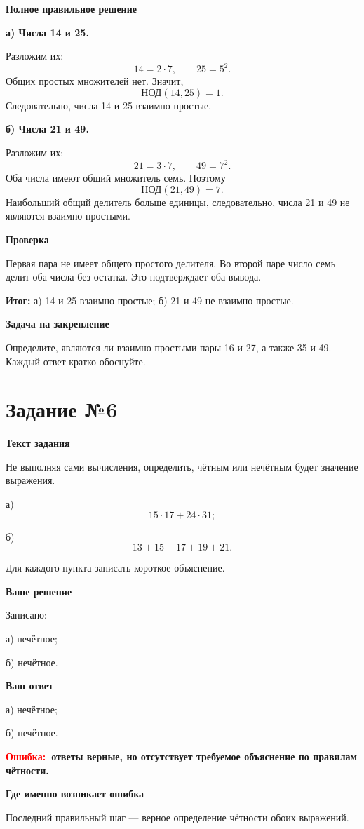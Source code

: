 \documentclass[12pt,a4paper]{article}
\newcommand{\err}{\textcolor{red}{Ошибка:}}
\newcommand{\result}{\textcolor{teal!60!black}{Итог:}}
\begin{document}
\textbf{Полное правильное решение}

\textbf{а) Числа 14 и 25.}

Разложим их:
\[
14=2\cdot7,
\qquad
25=5^2.
\]
Общих простых множителей нет. Значит,
\[
\text{НОД}(14,25)=1.
\]
Следовательно, числа 14 и 25 взаимно простые.

\textbf{б) Числа 21 и 49.}

Разложим их:
\[
21=3\cdot7,
\qquad
49=7^2.
\]
Оба числа имеют общий множитель семь. Поэтому
\[
\text{НОД}(21,49)=7.
\]
Наибольший общий делитель больше единицы, следовательно, числа 21 и 49 не являются взаимно простыми.

\textbf{Проверка}

Первая пара не имеет общего простого делителя. Во второй паре число семь делит оба числа без остатка. Это подтверждает оба вывода.

\textbf{\result} а) 14 и 25 взаимно простые; б) 21 и 49 не взаимно простые.

\textbf{Задача на закрепление}

Определите, являются ли взаимно простыми пары 16 и 27, а также 35 и 49. Каждый ответ кратко обоснуйте.

\newpage
{}\label{task:6}
\section*{Задание №6}

\textbf{Текст задания}

Не выполняя сами вычисления, определить, чётным или нечётным будет значение выражения.

а)
\[
15\cdot17+24\cdot31;
\]

б)
\[
13+15+17+19+21.
\]

Для каждого пункта записать короткое объяснение.

\textbf{Ваше решение}

Записано:

а) нечётное;

б) нечётное.

\textbf{Ваш ответ}

а) нечётное;

б) нечётное.

\textbf{\err\ ответы верные, но отсутствует требуемое объяснение по правилам чётности.}

\textbf{Где именно возникает ошибка}

Последний правильный шаг --- верное определение чётности обоих выражений.
\end{document}
